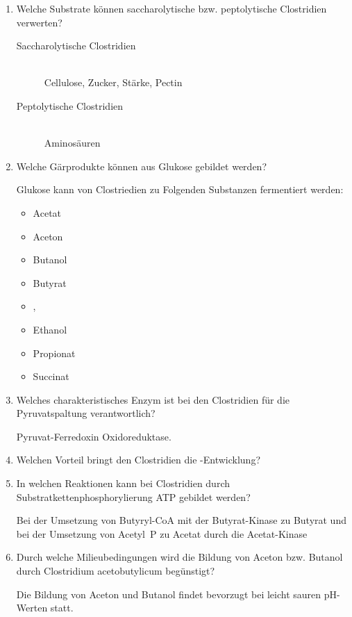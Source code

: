 \begin{enumerate}
	\item Welche Substrate können saccharolytische bzw. peptolytische Clostridien verwerten?

		\begin{description}
			\item[Saccharolytische Clostridien] \hfill \\
				Cellulose, Zucker, Stärke, Pectin
			\item[Peptolytische Clostridien] \hfill \\
				Aminosäuren
		\end{description}

	\item Welche Gärprodukte können aus Glukose gebildet werden?
		
		Glukose kann von Clostriedien zu Folgenden Substanzen fermentiert werden:
		\begin{itemize}
			\item Acetat
			\item Aceton
			\item Butanol
			\item Butyrat
			\item {}, 
			\item Ethanol
			\item Propionat
			\item Succinat
		\end{itemize}

	\item Welches charakteristisches Enzym ist bei den Clostridien für die Pyruvatspaltung verantwortlich?

		Pyruvat-Ferredoxin Oxidoreduktase.

	\item Welchen Vorteil bringt den Clostridien die -Entwicklung?


	\item In welchen Reaktionen kann bei Clostridien durch Substratkettenphosphorylierung ATP gebildet werden?

		Bei der Umsetzung von Butyryl-CoA mit der Butyrat-Kinase zu Butyrat und
		bei der Umsetzung von Acetyl~P zu Acetat durch die Acetat-Kinase

	\item Durch welche Milieubedingungen wird die Bildung von Aceton bzw. Butanol durch Clostridium acetobutylicum begünstigt?

		Die Bildung von Aceton und Butanol findet bevorzugt bei leicht sauren pH-Werten statt.


\end{enumerate}
